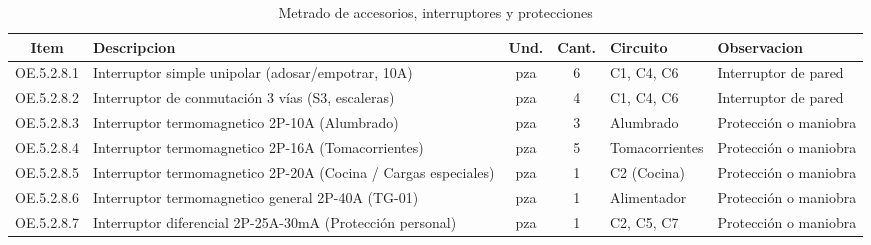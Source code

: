 \begin{table}[H]
\centering
\small
\setlength{\tabcolsep}{5pt}
\caption{Metrado de accesorios, interruptores y protecciones}
\label{tab:metrado-accesorios}
\begin{tabularx}{\textwidth}{c L{4.2cm} c c L{1.8cm} Y}
\toprule
\textbf{Item} & \textbf{Descripcion} & \textbf{Und.} & \textbf{Cant.} & \textbf{Circuito} & \textbf{Observacion} \\
\midrule
OE.5.2.8.1 & Interruptor simple unipolar (adosar/empotrar, 10A) & pza & 6 & C1, C4, C6 & Interruptor de pared \\
OE.5.2.8.2 & Interruptor de conmutación 3 vías (S3, escaleras) & pza & 4 & C1, C4, C6 & Interruptor de pared \\
OE.5.2.8.3 & Interruptor termomagnetico 2P-10A (Alumbrado) & pza & 3 & Alumbrado & Protección o maniobra \\
OE.5.2.8.4 & Interruptor termomagnetico 2P-16A (Tomacorrientes) & pza & 5 & Tomacorrientes & Protección o maniobra \\
OE.5.2.8.5 & Interruptor termomagnetico 2P-20A (Cocina / Cargas especiales) & pza & 1 & C2 (Cocina) & Protección o maniobra \\
OE.5.2.8.6 & Interruptor termomagnetico general 2P-40A (TG-01) & pza & 1 & Alimentador & Protección o maniobra \\
OE.5.2.8.7 & Interruptor diferencial 2P-25A-30mA (Protección personal) & pza & 1 & C2, C5, C7 & Protección o maniobra \\
\bottomrule
\end{tabularx}
\end{table}
